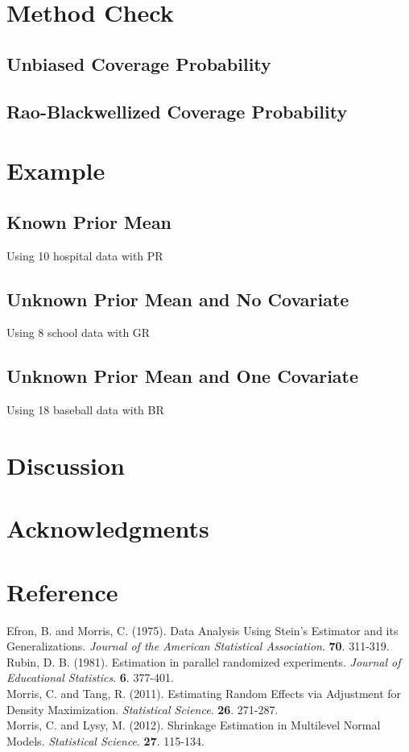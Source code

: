 \documentclass[article]{jss}
\begin{document}
\section[Method Check]{Method Check}
\subsection{Unbiased Coverage Probability}
\subsection{Rao-Blackwellized Coverage Probability}
\section[Example]{Example}
\subsection[Known Prior Mean]{Known Prior Mean}
Using 10 hospital data with PR
\subsection[Unknown Prior Mean and No Covariate]{Unknown Prior Mean and No Covariate}
Using 8 school data with GR
\subsection[Unknown Prior Mean and One Covariate]{Unknown Prior Mean and One Covariate}
Using 18 baseball data with BR

\section[Discussion]{Discussion}

\section[acknowledgments]{Acknowledgments}

\section[Reference]{Reference}
Efron, B. and Morris, C. (1975). Data Analysis Using Stein's Estimator and its Generalizations. \emph{Journal of the American Statistical Association}. \textbf{70}. 311-319.
\\
Rubin, D. B. (1981). Estimation in parallel randomized
  experiments. \emph{Journal of Educational Statistics}. \textbf{6}. 377-401.
\\
Morris, C. and Tang, R. (2011). Estimating Random Effects via Adjustment for Density Maximization. \emph{Statistical Science}. \textbf{26}. 271-287.
\\
Morris, C. and Lysy, M. (2012). Shrinkage Estimation in Multilevel Normal Models. \emph{Statistical Science}. \textbf{27}. 115-134.
\\
\end{document}
